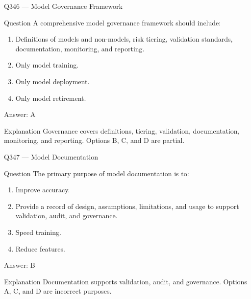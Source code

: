 \documentclass[aspectratio=169,8pt]{beamer}
\begin{document}
\begin{frame}{Q346 --- Model Governance Framework}
	\begin{block}{Question}
		A comprehensive model governance framework should include:
		\begin{enumerate}
			\item Definitions of models and non-models, risk tiering, validation standards, documentation, monitoring, and reporting.
			\item Only model training.
			\item Only model deployment.
			\item Only model retirement.
	\end{enumerate}  \end{block}
	\begin{exampleblock}{Answer: A}\end{exampleblock}
	\begin{block}{Explanation}
		Governance covers definitions, tiering, validation, documentation, monitoring, and reporting. Options B, C, and D are partial.
	\end{block}
\end{frame}

\begin{frame}{Q347 --- Model Documentation}
	\begin{block}{Question}
		The primary purpose of model documentation is to:
		\begin{enumerate}
			\item Improve accuracy.
			\item Provide a record of design, assumptions, limitations, and usage to support validation, audit, and governance.
			\item Speed training.
			\item Reduce features.
	\end{enumerate}  \end{block}
	\begin{exampleblock}{Answer: B}\end{exampleblock}
	\begin{block}{Explanation}
		Documentation supports validation, audit, and governance. Options A, C, and D are incorrect purposes.
	\end{block}
\end{frame}
\end{document}

